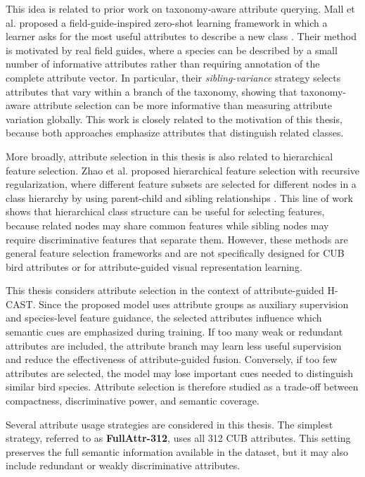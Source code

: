 This idea is related to prior work on taxonomy-aware attribute querying. Mall et al. proposed a field-guide-inspired zero-shot learning framework in which a learner asks for the most useful attributes to describe a new class \cite{mall2021field}. Their method is motivated by real field guides, where a species can be described by a small number of informative attributes rather than requiring annotation of the complete attribute vector. In particular, their \emph{sibling-variance} strategy selects attributes that vary within a branch of the taxonomy, showing that taxonomy-aware attribute selection can be more informative than measuring attribute variation globally. This work is closely related to the motivation of this thesis, because both approaches emphasize attributes that distinguish related classes.


More broadly, attribute selection in this thesis is also related to hierarchical feature selection. Zhao et al. proposed hierarchical feature selection with recursive regularization, where different feature subsets are selected for different nodes in a class hierarchy by using parent-child and sibling relationships \cite{zhao2017hierarchical}. This line of work shows that hierarchical class structure can be useful for selecting features, because related nodes may share common features while sibling nodes may require discriminative features that separate them. However, these methods are general feature selection frameworks and are not specifically designed for CUB bird attributes or for attribute-guided visual representation learning.


This thesis considers attribute selection in the context of attribute-guided H-CAST. Since the proposed model uses attribute groups as auxiliary supervision and species-level feature guidance, the selected attributes influence which semantic cues are emphasized during training. If too many weak or redundant attributes are included, the attribute branch may learn less useful supervision and reduce the effectiveness of attribute-guided fusion. Conversely, if too few attributes are selected, the model may lose important cues needed to distinguish similar bird species. Attribute selection is therefore studied as a trade-off between compactness, discriminative power, and semantic coverage.

Several attribute usage strategies are considered in this thesis. The simplest strategy, referred to as \textbf{FullAttr-312}, uses all 312 CUB attributes. This setting preserves the full semantic information available in the dataset, but it may also include redundant or weakly discriminative attributes.

